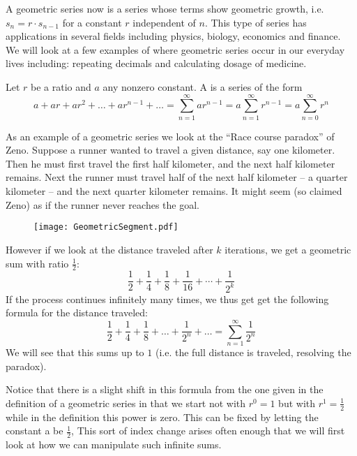 A geometric series now is a series whose terms show geometric growth, i.e.
$s_n=r\cdot s_{n-1}$ for a constant $r$ independent of $n$.
This type of series has applications in several fields
including physics, biology, economics and finance. We will look at a
few examples of where geometric series occur in our everyday lives
including: repeating decimals and calculating dosage of medicine.
\begin{Definition}
Let $r$ be a ratio and $a$ any nonzero constant. A 
is a series of the form
\[
a+ ar + ar^{2}+ \ldots + ar^{n-1}+ \ldots = \sum_{n=1}^{\infty}
ar^{n-1} =a\sum_{n=1}^\infty r^{n-1}=a\sum_{n=0}^\infty r^n
\]
\end{Definition}

As an example of a geometric series we look at the ``Race course paradox'' of
Zeno.
Suppose a runner wanted to travel a given distance, say one kilometer. Then
he must first travel the first half kilometer, and the next half kilometer
remains.  Next the runner must travel half of the next half kilometer -- a
quarter kilometer  -- and the next quarter kilometer remains. It might seem
(so claimed Zeno) as if the runner never reaches the goal.

\begin{figure}[h]
\begin{center}
\texttt{[image: GeometricSegment.pdf]}
\end{center}
\end{figure}

However if we look at the distance traveled after $k$ iterations, we
get a geometric sum with ratio $\frac{1}{2}$:
\[
\frac{1}{2}+\frac{1}{4}
+\frac{1}{8}+\frac{1}{16}+\cdots+\frac{1}{2^k}
\]
If the process continues infinitely many times, we thus get get the
following formula for the distance traveled:
\[
\frac{1}{2} + \frac{1}{4} + \frac{1}{8} + \ldots + \frac{1}{2^{n}} +
\ldots = \sum_{n=1}^{\infty} \frac{1}{2^{n}}
\]
We will see that this sums up to $1$ (i.e. the full distance is traveled,
resolving the paradox).

Notice that there is a slight shift in this formula from the one
given in the definition of a geometric series in that we start not
with $r^0=1$ but with $r^{1}=\frac{1}{2}$ while in the definition
this power is zero.  This can be fixed by letting the constant a be
$\frac{1}{2}$, This sort of index change arises often enough that we
will first look at how we can manipulate such infinite sums.

